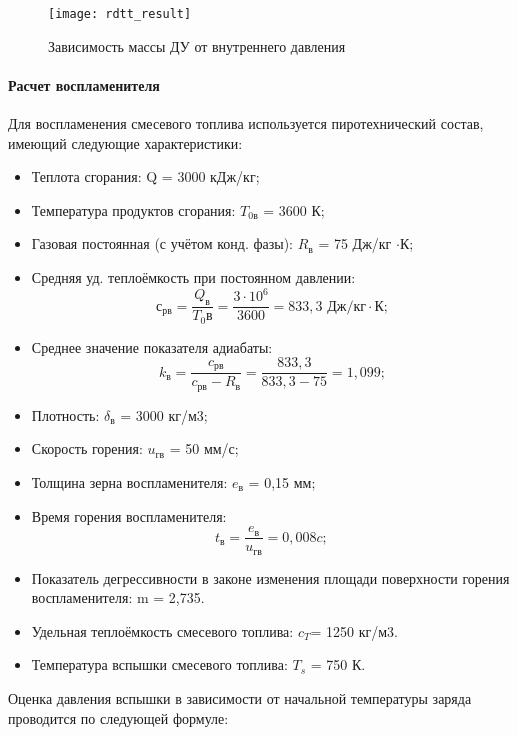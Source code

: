 \begin{figure}[h]
\begin{center}
    \texttt{[image: rdtt\_result]}
    \caption{Зависимость массы ДУ от внутреннего давления}
    \label{fig:rdtt_result}
\end{center}
\end{figure}




\paragraph{Расчет воспламенителя}

Для воспламенения смесевого топлива используется пиротехнический состав, имеющий следующие характеристики:
\begin{itemize}
	\item Теплота сгорания:					Q = 3000 кДж/кг;
	\item Температура продуктов сгорания:			$T_\text{0в}$ = 3600 К;
	\item Газовая постоянная (с учётом конд. фазы):	$R_\text{в}$ = 75 Дж/кг $\cdot $К;

	\item Средняя уд. теплоёмкость при постоянном давлении:
$$с_\text{рв}= \frac{Q_\text{в}}{T_0в} = \frac{3 \cdot 10^6}{3600} = 833,3 \text{ Дж/кг}\cdot \text{К;}$$

	\item Среднее значение показателя адиабаты:
$$k_\text{в}= \dfrac{c_\text{рв}} {c_\text{рв}-R_\text{в}} = \frac{833,3}{833,3-75}=1,099 \text{;}$$

	\item Плотность:							$\delta_\text{в}$ = 3000 кг/м3;
	\item Скорость горения:				$	u_\text{гв}$ = 50 мм/с;
	\item Толщина зерна воспламенителя:			$e_\text{в}$ = 0,15 мм;
	\item Время горения воспламенителя:
$$t_\text{в}=\frac{e_\text{в}}{u_\text{гв}} =0,008 c;$$

	\item Показатель дегрессивности в законе изменения площади поверхности горения воспламенителя: 		m = 2,735.
	\item Удельная теплоёмкость смесевого топлива:	$c_T $= 1250 кг/м3.
	\item Температура вспышки смесевого топлива:	$T_s $ = 750 К.
\end{itemize}

Оценка давления вспышки в зависимости от начальной температуры заряда проводится по следующей формуле:

